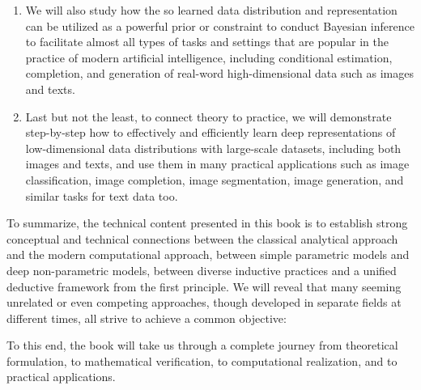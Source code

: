\documentclass[../../book-main.tex]{subfiles}
\begin{document}
\begin{enumerate}
\item We will also study how the so learned data distribution and representation can be utilized as a powerful prior or constraint to conduct Bayesian inference to facilitate almost all types of tasks and settings that are popular in the practice of modern artificial intelligence, including conditional estimation, completion, and generation of real-word high-dimensional data such as images and texts. 

\item Last but not the least, to connect theory to practice, we will demonstrate step-by-step how to effectively and efficiently learn deep representations of low-dimensional data distributions with large-scale datasets, including both images and texts, and use them in many practical applications such as image classification, image completion, image segmentation, image generation, and similar tasks for text data too. 
\end{enumerate}

To summarize, the technical content presented in this book is to establish strong conceptual and technical connections between the classical analytical approach and the modern computational approach, between simple parametric models and deep non-parametric models, between diverse inductive practices and a unified deductive framework from the first principle. We will reveal that many seeming unrelated or even competing approaches, though developed in separate fields at different times, all strive to achieve a common objective: 
\begin{quote}
\end{quote}
To this end, the book will take us through a complete journey from theoretical formulation, to mathematical verification, to computational realization, and to practical applications.
\end{document}
